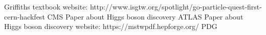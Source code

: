 \begin{thebibliography}{1}
 Griffiths textbook
 website: http://www.isgtw.org/spotlight/go-particle-quest-first-cern-hackfest
 CMS Paper about Higgs boson discovery
 ATLAS Paper about Higgs boson discovery
 website: https://mstwpdf.hepforge.org/
 PDG



\end{thebibliography}
